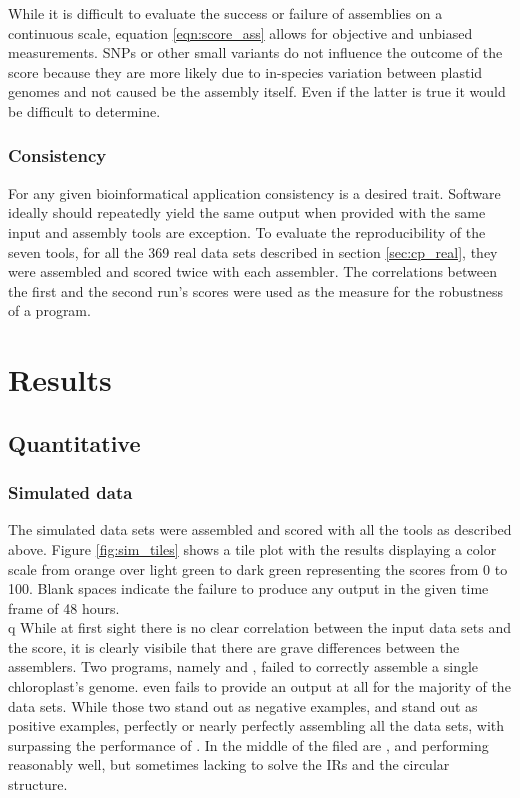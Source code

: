 While it is difficult to evaluate the success or failure of assemblies on a continuous
scale, equation \ref{eqn:score_ass} allows for objective and unbiased measurements. SNPs
or other small variants do not influence the outcome of the score because they are more
likely due to in-species variation between plastid genomes and not caused be the assembly
itself. Even if the latter is true it would be difficult to determine.
  
\subsubsection{Consistency}
For any given bioinformatical application consistency is a desired trait. Software ideally
should repeatedly yield the same output when provided with the same input and assembly
tools are exception. To evaluate the reproducibility of the seven tools, for all the 369 real
data sets described in section \ref{sec:cp_real}, they were assembled and scored twice
with each assembler. The correlations between the first and the second run's scores were
used as the measure for the robustness of a program.

\section{Results} \label{results:ca}
\subsection{Quantitative}
\subsubsection{Simulated data}
\label{results:sim}

The simulated data sets were assembled and scored with all the tools as described
above. Figure \ref{fig:sim_tiles} shows a tile plot with the results displaying a color
scale from orange over light
green to dark green representing the scores from 0 to 100. Blank spaces indicate the failure to produce any output in the given time frame of 48 hours. \\q
While at first sight there is no clear correlation between the input data sets and the
score, it is clearly visibile that there are grave differences between the assemblers. Two
programs, namely \cassp \hspace{0.25ex} and \ioga, failed to correctly assemble a single
chloroplast's genome. \ioga \hspace{0.25ex} even fails to provide an output at all for the
majority of the data sets. While those two stand out as negative examples, \fp
\hspace{0.25ex} and \go \hspace{0.25ex} stand out as positive examples, perfectly or nearly
perfectly assembling all the data sets, with \go \hspace{0.25ex} surpassing the performance
of \fp. In the middle of the filed are \ce, \oa \hspace{0.25ex} and \np \hspace{0.25ex}
performing reasonably well, but sometimes lacking to solve the IRs and the circular
structure.


